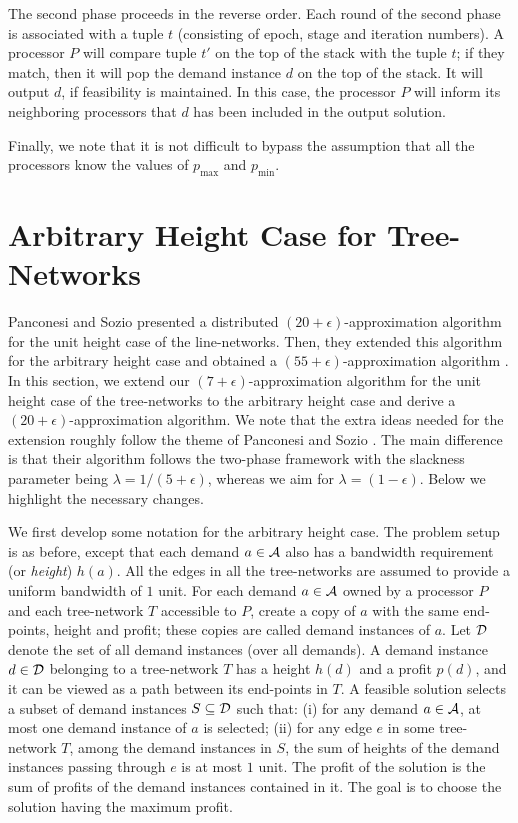 \documentclass[11pt]{article}
\newcommand{\calA} {{\cal A}}
\newcommand{\calD} {{\cal D}}
\begin{document}
The second phase proceeds in the reverse order. Each round of the second phase
is associated with a tuple $t$ (consisting of epoch, stage and iteration numbers).  
A processor $P$ will compare tuple $t'$ on the top of the stack
with the tuple $t$; if they match, then it will pop the demand instance $d$ on the top of the stack.
It will output $d$, if feasibility is maintained.
In this case, the processor $P$ will inform its neighboring processors
that $d$ has been included in the output solution.

Finally, we note that it is not difficult to bypass the assumption that all the processors know 
the values of $p_{\max}$ and $p_{\min}$.

\section{Arbitrary Height Case for Tree-Networks}
\label{sec:arbit}
Panconesi and Sozio \cite{Pancc} presented a distributed $(20+\epsilon)$-approximation algorithm
for the unit height case of the line-networks. Then, they extended this algorithm 
for the arbitrary height case and obtained a $(55+\epsilon)$-approximation algorithm \cite{Pancj}.
In this section, we extend our $(7+\epsilon)$-approximation algorithm for the unit height case
of the tree-networks to the arbitrary height case and derive a $(20+\epsilon)$-approximation algorithm. 
We note that the extra ideas needed for the extension roughly follow the theme of Panconesi and Sozio \cite{Pancj}. 
The main difference is that their algorithm follows the two-phase framework with the 
slackness parameter being $\lambda = 1/(5+\epsilon)$, whereas we aim for $\lambda=(1-\epsilon)$.
Below we highlight the necessary changes.

We first develop some notation for the arbitrary height case.
The problem setup is as before, except that each demand $a\in \calA$
also has a bandwidth requirement (or {\em height}) $h(a)$.
All the edges in all the tree-networks are assumed to provide a uniform bandwidth of $1$ unit.
For each demand $a\in \calA$ owned by a processor $P$ and each tree-network $T$ accessible to $P$,
create a copy of $a$ with the same end-points, height and profit; these copies are called
demand instances of $a$.
Let $\calD$ denote the set of all demand instances (over all demands).
A demand instance $d\in \calD$ belonging to a tree-network $T$ has a height $h(d)$ and a profit $p(d)$,
and it can be viewed as a path between its end-points in $T$.
A feasible solution selects a subset of demand instances $S\subseteq \calD$
such that: (i) for any demand $a\in \calA$, at most one demand instance of $a$ is selected;
(ii) for any edge $e$ in some tree-network $T$,
among the demand instances in $S$, the sum of heights of the demand instances passing through $e$ is at most $1$ unit.
The profit of the solution is the sum of profits of the demand instances contained in it.
The goal is to choose the solution having the maximum profit.
\end{document}
